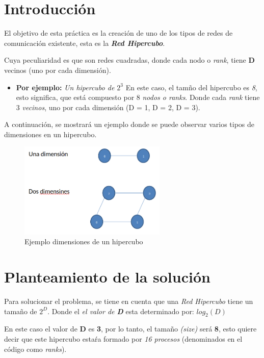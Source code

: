 \documentclass[11pt]{article}
\begin{document}
\section{Introducción}
El objetivo de esta práctica es la creación de uno de los tipos de redes de comunicación existente, esta es la \textbf{\textit{Red Hipercubo}}.
 
Cuya peculiaridad es que son redes cuadradas, donde cada nodo o \textit{rank}, tiene \textbf{D} vecinos (uno por cada dimensión).

\begin{itemize}
	\item \textbf{Por ejemplo:} \textit{Un hipercubo de $2^3$}
	En este caso, el tamño del hipercubo es \textit{8}, esto significa, que está compuesto por 8 \textit{nodos o ranks}.
	Donde cada \textit{rank} tiene 3 \textit{vecinos}, uno por cada dimensión (D = 1, D = 2, D = 3).
\end{itemize} 

A continuación, se mostrará un ejemplo donde se puede observar varios tipos de dimensiones en un hipercubo.

\begin{figure}[H]
  \centering
    \includegraphics[width=70mm]{dimensiones.png}
  \caption{Ejemplo dimensiones de un hipercubo}
  \label{fig:matriz}
\end{figure}

\clearpage


\section{Planteamiento de la solución}
Para solucionar el problema, se tiene en cuenta que una \textit{Red Hipercubo} tiene un tamaño de $2^D$.
Donde el \textit{el valor de \textbf{D}} esta determinado por: $log_2 (D)$

En este caso el valor de \textbf{D} es \textbf{3}, por lo tanto, el tamaño \textit{(size)} será \textbf{8}, esto quiere decir que este hipercubo estaŕa formado por \textit{16 procesos} (denominados en el código como \textit{ranks}).
\end{document}
